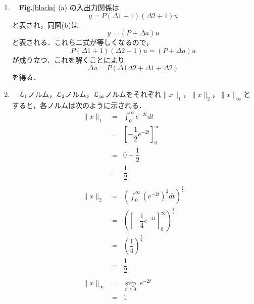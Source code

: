 \documentclass[a4paper,11pt]{jarticle}
\begin{document}
\begin{enumerate}
 \item 
\ \ {\bf Fig.}{\ref{blocks}} (a) の入出力関係は
\begin{equation}
 y = P(\Delta 1 + 1)(\Delta 2 + 1) u
\end{equation}
と表され，同図(b)は
\begin{equation}
 y = (P + \Delta a)u
\end{equation}
と表される．これら二式が等しくなるので，
\begin{equation}
 P(\Delta 1 + 1)(\Delta 2 + 1) u = (P + \Delta a)u
\end{equation}
が成り立つ．これを解くことにより
\begin{equation}
 \Delta a = P(\Delta 1 \Delta 2 + \Delta 1 + \Delta 2)
\end{equation}
を得る．
 \item 
\ \ $ {\cal L}_1 $ノルム，$ {\cal L}_2 $ノルム，$ {\cal L}_{\infty} $ノルムをそれぞれ$ \|x\|_1 $，$ \|x\|_2 $，$ \|x\|_{\infty} $とすると，各ノルムは次のように示される．
\begin{eqnarray}
 \|x\|_1 & = & \int_0^{\infty} e^{-2t} dt \nonumber \\
         & = & \left[- \dfrac{1}{2} e^{-2t} \right]^{\infty}_0 \nonumber \\
         & = & 0 + \dfrac{1}{2} \nonumber \\
         & = & \dfrac{1}{2} \\ \nonumber \\
 \|x\|_2 & = & \left( \int_0^{\infty} \left( e^{-2t} \right)^2 dt \right)^{\frac{1}{2}} \nonumber \\
         & = & \left( \left[ - {\dfrac{1}{4}}e^{-4t} \right]^{\infty}_0 \right)^{\frac{1}{2}} \nonumber \\
         & = & \left( {\dfrac{1}{4}} \right)^{\frac{1}{2}} \nonumber \\
         & = & \dfrac{1}{2} \\ \nonumber \\
 \|x\|_{\infty} & = & \sup_{t \geq 0} ~ e^{-2t} \nonumber \\
                & = & 1
\end{eqnarray}
\end{enumerate}





\end{document}
